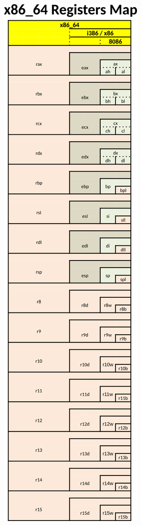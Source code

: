 \documentclass[letterpaper,12pt]{exam}
\begin{document}
\begin{center}
\includegraphics{../../02_Registers/images/X86_64-GP-registersBIG}
\end{center}
\end{document}
